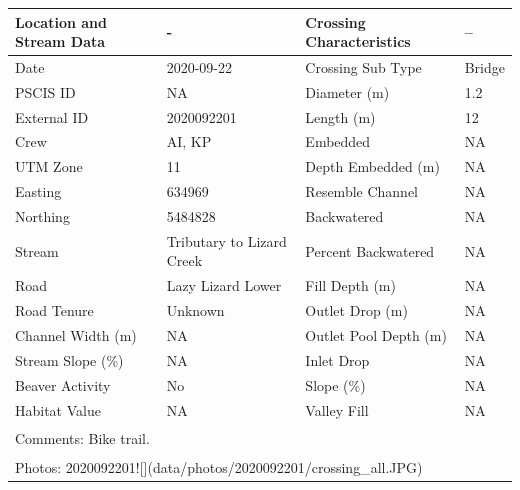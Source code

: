 \documentclass[
]{book}
\begin{document}
\begin{tabular}{l|l|l|l}
\hline
Location and Stream Data & - & Crossing Characteristics & --\\
\hline
Date & 2020-09-22 & Crossing Sub Type & Bridge\\
\hline
PSCIS ID & NA & Diameter (m) & 1.2\\
\hline
External ID & 2020092201 & Length (m) & 12\\
\hline
Crew & AI, KP & Embedded & NA\\
\hline
UTM Zone & 11 & Depth Embedded (m) & NA\\
\hline
Easting & 634969 & Resemble Channel & NA\\
\hline
Northing & 5484828 & Backwatered & NA\\
\hline
Stream & Tributary to Lizard Creek & Percent Backwatered & NA\\
\hline
Road & Lazy Lizard Lower & Fill Depth (m) & NA\\
\hline
Road Tenure & Unknown & Outlet Drop (m) & NA\\
\hline
Channel Width (m) & NA & Outlet Pool Depth (m) & NA\\
\hline
Stream Slope (\%) & NA & Inlet Drop & NA\\
\hline
Beaver Activity & No & Slope (\%) & NA\\
\hline
Habitat Value & NA & Valley Fill & NA\\
\hline
\multicolumn{4}{l}{\textsuperscript{} Comments: Bike trail.}\\
\multicolumn{4}{l}{\textsuperscript{} Photos: 2020092201![](data/photos/2020092201/crossing\_all.JPG)}\\
\end{tabular}
\end{document}
